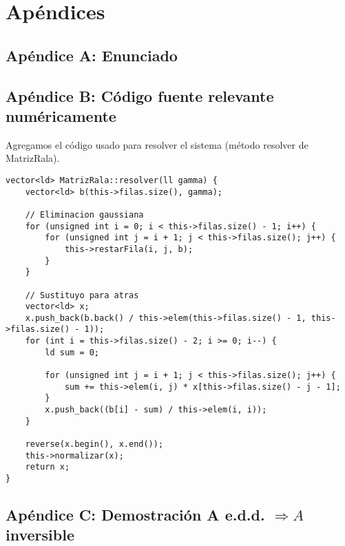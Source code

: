 \section{Apéndices}

\subsection{Apéndice A: Enunciado}


\subsection{Apéndice B: Código fuente relevante numéricamente}
Agregamos el código usado para resolver el sistema (método resolver de MatrizRala).
\begin{lstlisting}
vector<ld> MatrizRala::resolver(ll gamma) {
    vector<ld> b(this->filas.size(), gamma);

    // Eliminacion gaussiana
    for (unsigned int i = 0; i < this->filas.size() - 1; i++) {
        for (unsigned int j = i + 1; j < this->filas.size(); j++) {
            this->restarFila(i, j, b);
        }
    }

    // Sustituyo para atras
    vector<ld> x;
    x.push_back(b.back() / this->elem(this->filas.size() - 1, this->filas.size() - 1));
    for (int i = this->filas.size() - 2; i >= 0; i--) {
        ld sum = 0;

        for (unsigned int j = i + 1; j < this->filas.size(); j++) {
            sum += this->elem(i, j) * x[this->filas.size() - j - 1];
        }
        x.push_back((b[i] - sum) / this->elem(i, i));
    }

    reverse(x.begin(), x.end());
    this->normalizar(x);
    return x;
}
\end{lstlisting}

\subsection{Apéndice C: Demostración A e.d.d. $\Rightarrow A$ inversible}

